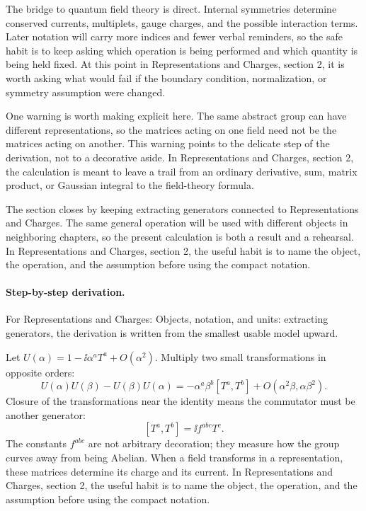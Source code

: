 The bridge to quantum field theory is direct.  Internal symmetries determine conserved currents, multiplets, gauge charges, and the possible interaction terms.  Later notation will carry more indices and fewer verbal reminders, so the safe habit is to keep asking which operation is being performed and which quantity is being held fixed.  At this point in Representations and Charges, section 2, it is worth asking what would fail if the boundary condition, normalization, or symmetry assumption were changed.

One warning is worth making explicit here.  The same abstract group can have different representations, so the matrices acting on one field need not be the matrices acting on another.  This warning points to the delicate step of the derivation, not to a decorative aside.  In Representations and Charges, section 2, the calculation is meant to leave a trail from an ordinary derivative, sum, matrix product, or Gaussian integral to the field-theory formula.

The section closes by keeping extracting generators connected to Representations and Charges.  The same general operation will be used with different objects in neighboring chapters, so the present calculation is both a result and a rehearsal.  In Representations and Charges, section 2, the useful habit is to name the object, the operation, and the assumption before using the compact notation.



\paragraph{Step-by-step derivation.}

For Representations and Charges: Objects, notation, and units: extracting generators, the derivation is written from the smallest usable model upward.

Let \(U(\alpha)=1-\ii\alpha^aT^a+O(\alpha^2)\).  Multiply two small transformations in opposite orders:
\[
  U(\alpha)U(\beta)-U(\beta)U(\alpha)
  =
  -\alpha^a\beta^b[T^a,T^b]+O(\alpha^2\beta,\alpha\beta^2).
\]
Closure of the transformations near the identity means the commutator must be another generator:
\[
  [T^a,T^b]=\ii f^{abc}T^c.
\]
The constants \(f^{abc}\) are not arbitrary decoration; they measure how the group curves away from being Abelian.  When a field transforms in a representation, these matrices determine its charge and its current.  In Representations and Charges, section 2, the useful habit is to name the object, the operation, and the assumption before using the compact notation.

